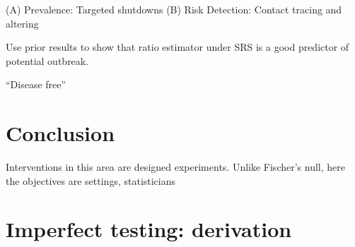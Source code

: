 \documentclass[12pt]{article}
\numberwithin{equation}{section}
\theoremstyle{plain}
\begin{document}
(A) Prevalence: Targeted shutdowns
(B) Risk Detection: Contact tracing and altering

Use prior results to show that ratio estimator under SRS is a good predictor of potential outbreak.

``Disease free''


\section{Conclusion}

Interventions in this area are designed experiments.  Unlike Fischer's null, here the objectives are settings, statisticians

\appendix

\section{Imperfect testing: derivation}
\end{document}
